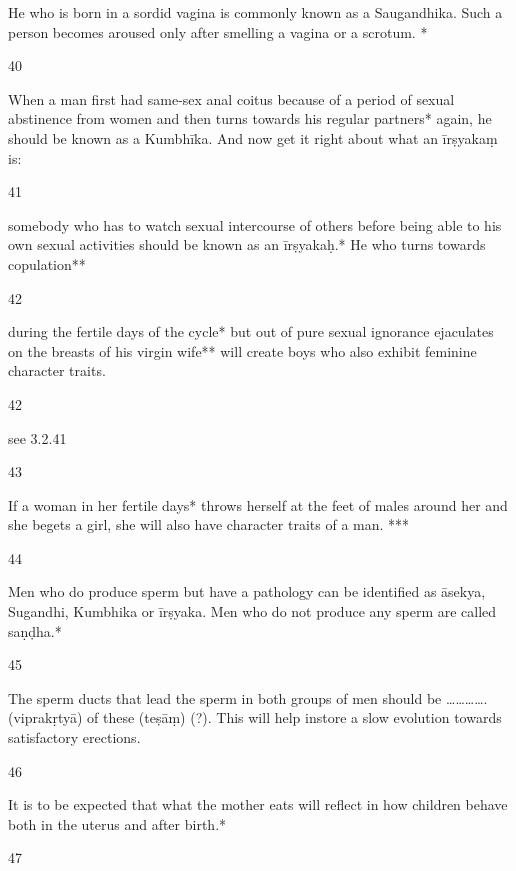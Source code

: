 \begin{translation}
\begin{tt}
 He who is born in a sordid vagina is commonly known as a Saugandhika. 
  Such a person becomes aroused only after smelling a vagina or a scrotum. *
  
\item[40]

 When a man first had same-sex anal coitus because of a period of 
  sexual abstinence from women and then turns towards his regular partners* 
  again, he should be known as a Kumbhīka. And now get it right about what an 
  īrṣyakaṃ is:
  
\item[41]

 somebody who has to watch sexual intercourse of others before being 
  able to his own sexual activities should be known as an  īrṣyakaḥ.* He who 
  turns towards copulation**
  
\item[42]

 during the fertile days of the cycle* but out of pure sexual ignorance 
  ejaculates on the breasts of his virgin wife** will create boys who also exhibit 
  feminine character traits.
  
\item[42]

see 3.2.41
  
\item[43]

 If a woman in her fertile days* throws herself at the feet of males 
  around her and she begets a girl, she will also have character traits of a man. 
  *** 
  
\item[44]

Men who do produce sperm but have a pathology can be identified as 
  āsekya, Sugandhi, Kumbhika or īrṣyaka. Men who do not produce any sperm 
  are called saṇḍha.*
  
\item[45]

The sperm ducts that lead the sperm in both groups of men should be 
  …………. (viprakṛtyā) of these (teṣāṃ) (?). This will help instore a slow evolution 
  towards satisfactory erections. 
  
\item[46]

 It is to be expected that what the mother eats will reflect in how 
  children behave both in the uterus and after birth.*
  
\item[47]


\end{tt}
\end{translation}
